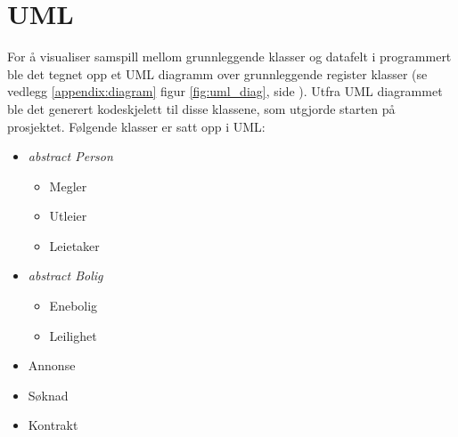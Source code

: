 \section{UML}
For å visualiser samspill mellom grunnleggende klasser og datafelt i programmert ble det tegnet opp et UML diagramm over grunnleggende register klasser (se vedlegg \ref{appendix:diagram} figur \ref{fig:uml_diag}, side \pageref{appendix:diagram}). Utfra UML diagrammet ble det generert kodeskjelett til disse klassene, som utgjorde starten på prosjektet. Følgende klasser er satt opp i UML:
\begin{itemize}[noitemsep,nolistsep]
	\item \textit{abstract Person}
		\begin{itemize}
			\item Megler
			\item Utleier
			\item Leietaker
		\end{itemize}
	\item \textit{abstract Bolig}
		\begin{itemize}
			\item Enebolig
			\item Leilighet
		\end{itemize}
	\item Annonse
	\item Søknad
	\item Kontrakt
\end{itemize}



